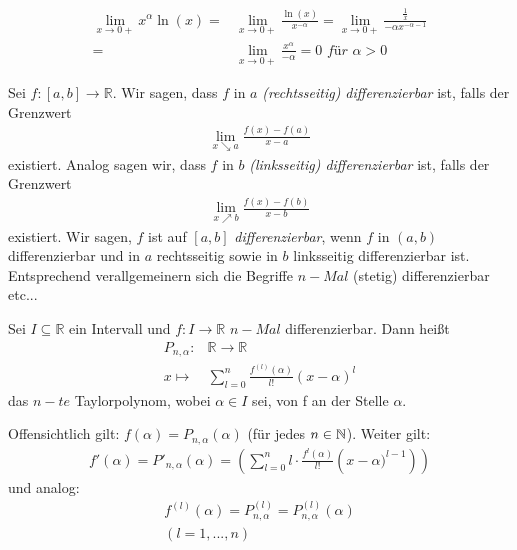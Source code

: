 
\begin{Beispiel}{
	\begin{align*}
		\lim\limits_{x \rightarrow 0+}{x^{\alpha} \ln(x)} = &
		\lim\limits_{x \rightarrow 0+}{\frac{\ln(x)}{x^{- \alpha}}}
		= \lim\limits_{x \rightarrow 0+}{\frac{\frac{1}{x}}{-\alpha x^{-\alpha-1}}}
		\\ = & \lim\limits_{x \rightarrow 0+}{\frac{x^{\alpha}}{-\alpha}}
		= 0 \textit{ für } \alpha > 0 
	\end{align*}
}\end{Beispiel}

\begin{Definition}{
	Sei $f: [a,b] \rightarrow \mathbb{R}$. Wir sagen, dass $f$ in $a$ 
	\textit{(rechtsseitig) differenzierbar} ist, falls der Grenzwert
	\begin{align*}
		\lim\limits_{x \searrow a}{\frac{f(x)-f(a)}{x-a}}
	\end{align*}
	existiert.
	Analog sagen wir, dass $f$ in $b$ \textit{(linksseitig) differenzierbar} ist, 
	falls der Grenzwert 
	\begin{align*}
		\lim\limits_{x \nearrow b}{\frac{f(x)-f(b)}{x-b}}
	\end{align*}
	existiert. Wir sagen, $f$ ist auf $[a,b]$ \textit{differenzierbar}, wenn $f$ in 
	$(a,b)$ differenzierbar und in $a$ rechtsseitig sowie in $b$ linksseitig 
	differenzierbar ist. Entsprechend verallgemeinern sich die Begriffe $n-Mal$
	(stetig) differenzierbar etc...
	
}\end{Definition}

\begin{Definition}{
	Sei $I \subseteq \mathbb{R}$ ein Intervall und $f : I \rightarrow \mathbb{R}$ 
	$n-Mal$ differenzierbar. Dann heißt 
	\begin{align*}
		P_{n, \alpha} : & \mathbb{R} \rightarrow \mathbb{R} \\
		x \mapsto & \sum_{l = 0}^n \frac{f^{(l)}(\alpha)}{l !} (x - \alpha)^l
	\end{align*}
	das $n-te$ Taylorpolynom, wobei $\alpha \in I$ sei, von f an der Stelle 
	$\alpha$.
}\end{Definition}

\begin{Bemerkung}{
	Offensichtlich gilt: 
	$f(\alpha) = P_{n, \alpha} ( \alpha)$ (für jedes $n \in \mathbb{N}$). Weiter gilt: 
	\begin{align*}
		f'(\alpha) = P'_{n, \alpha}(\alpha) = \left( \sum_{l = 0}^n l 
		\cdot \frac{f^l (\alpha)}{l!} \left( x  - \alpha) ^{l-1} \right) \right)
	\end{align*}
	und analog: 
	\begin{align*}
		f^{(l)} (\alpha) = P_{n, \alpha}^{(l)} = P_{n, \alpha}^{(l)} (\alpha) \\
		( l = 1, ..., n)
	\end{align*}
}\end{Bemerkung}

